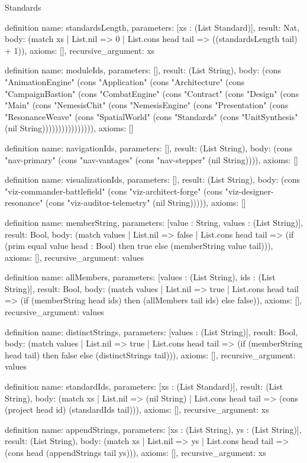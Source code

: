 \begin{lexlean}{Standards}
\begin{semanticmodule}
definition{
  name: standardsLength,
  parameters: [xs : (List Standard)],
  result: Nat,
  body: (match xs
    | List.nil => 0
    | List.cons head tail => ((standardsLength tail) + 1)),
  axioms: [],
  recursive_argument: xs
}

definition{
  name: moduleIds,
  parameters: [],
  result: (List String),
  body: (cons "AnimationEngine" (cons "Application" (cons "Architecture" (cons "CampaignBastion" (cons "CombatEngine" (cons "Contract" (cons "Design" (cons "Main" (cons "NemesisChit" (cons "NemesisEngine" (cons "Presentation" (cons "ResonanceWeave" (cons "SpatialWorld" (cons "Standards" (cons "UnitSynthesis" (nil String)))))))))))))))),
  axioms: []
}

definition{
  name: navigationIds,
  parameters: [],
  result: (List String),
  body: (cons "nav-primary" (cons "nav-vantages" (cons "nav-stepper" (nil String)))),
  axioms: []
}

definition{
  name: visualizationIds,
  parameters: [],
  result: (List String),
  body: (cons "viz-commander-battlefield" (cons "viz-architect-forge" (cons "viz-designer-resonance" (cons "viz-auditor-telemetry" (nil String))))),
  axioms: []
}

definition{
  name: memberString,
  parameters: [value : String, values : (List String)],
  result: Bool,
  body: (match values
    | List.nil => false
    | List.cons head tail => (if (prim equal value head : Bool) then true else (memberString value tail))),
  axioms: [],
  recursive_argument: values
}

definition{
  name: allMembers,
  parameters: [values : (List String), ids : (List String)],
  result: Bool,
  body: (match values
    | List.nil => true
    | List.cons head tail => (if (memberString head ids) then (allMembers tail ids) else false)),
  axioms: [],
  recursive_argument: values
}

definition{
  name: distinctStrings,
  parameters: [values : (List String)],
  result: Bool,
  body: (match values
    | List.nil => true
    | List.cons head tail => (if (memberString head tail) then false else (distinctStrings tail))),
  axioms: [],
  recursive_argument: values
}

definition{
  name: standardIds,
  parameters: [xs : (List Standard)],
  result: (List String),
  body: (match xs
    | List.nil => (nil String)
    | List.cons head tail => (cons (project head id) (standardIds tail))),
  axioms: [],
  recursive_argument: xs
}

definition{
  name: appendStrings,
  parameters: [xs : (List String), ys : (List String)],
  result: (List String),
  body: (match xs
    | List.nil => ys
    | List.cons head tail => (cons head (appendStrings tail ys))),
  axioms: [],
  recursive_argument: xs
}


\end{semanticmodule}
\end{lexlean}
